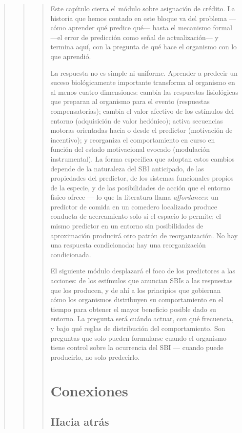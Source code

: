 \documentclass[
  letterpaper,
  DIV=11,
  numbers=noendperiod]{scrreprt}
\begin{document}
\begin{tcolorbox}[enhanced jigsaw, arc=.35mm, bottomrule=.15mm, breakable, colback=white, colframe=quarto-callout-note-color-frame, left=2mm, leftrule=.75mm, opacityback=0, rightrule=.15mm, toprule=.15mm]
\begin{quote}
\begin{quote}
\begin{quote}
Este capítulo cierra el módulo sobre asignación de crédito. La historia
que hemos contado en este bloque va del problema ---cómo aprender qué
predice qué--- hasta el mecanismo formal ---el error de predicción como
señal de actualización--- y termina aquí, con la pregunta de qué hace el
organismo con lo que aprendió.

La respuesta no es simple ni uniforme. Aprender a predecir un suceso
biológicamente importante transforma al organismo en al menos cuatro
dimensiones: cambia las respuestas fisiológicas que preparan al
organismo para el evento (respuestas compensatorias); cambia el valor
afectivo de los estímulos del entorno (adquisición de valor hedónico);
activa secuencias motoras orientadas hacia o desde el predictor
(motivación de incentivo); y reorganiza el comportamiento en curso en
función del estado motivacional evocado (modulación instrumental). La
forma específica que adoptan estos cambios depende de la naturaleza del
SBI anticipado, de las propiedades del predictor, de los sistemas
funcionales propios de la especie, y de las posibilidades de acción que
el entorno físico ofrece --- lo que la literatura llama
\emph{affordances}: un predictor de comida en un comedero localizado
produce conducta de acercamiento solo si el espacio lo permite; el mismo
predictor en un entorno sin posibilidades de aproximación producirá otro
patrón de reorganización. No hay una respuesta condicionada: hay una
reorganización condicionada.

El siguiente módulo desplazará el foco de los predictores a las
acciones: de los estímulos que anuncian SBIs a las respuestas que los
producen, y de ahí a los principios que gobiernan cómo los organismos
distribuyen su comportamiento en el tiempo para obtener el mayor
beneficio posible dado su entorno. La pregunta será cuándo actuar, con
qué frecuencia, y bajo qué reglas de distribución del comportamiento.
Son preguntas que solo pueden formularse cuando el organismo tiene
control sobre la ocurrencia del SBI --- cuando puede producirlo, no solo
predecirlo.

\mbox{}%
\section{Conexiones}\label{conexiones-5}

\mbox{}%
\subsection{Hacia atrás}\label{hacia-atruxe1s}


\end{quote}
\end{quote}
\end{quote}
\end{tcolorbox}
\end{document}
